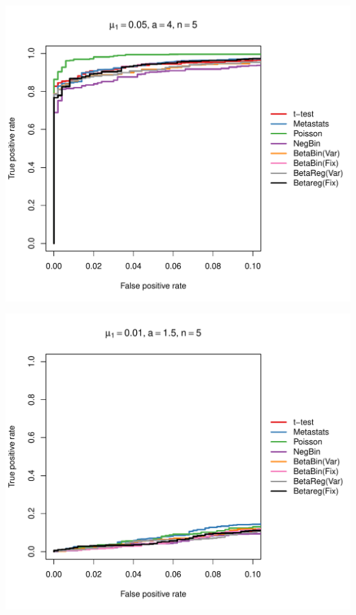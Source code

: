 \documentclass[12pt]{article}\usepackage{graphicx, color}
\makeatletter
\def\maxwidth{ %
  \ifdim\Gin@nat@width>\linewidth
    \linewidth
  \else
    \Gin@nat@width
  \fi
}
\newenvironment{knitrout}{}{} %
\makeatother
\begin{document}
\begin{knitrout}
{\centering \includegraphics[width=\maxwidth]{figure/rocs9} 

}




{\centering \includegraphics[width=\maxwidth]{figure/rocs10} 

}





\end{knitrout}
\end{document}
